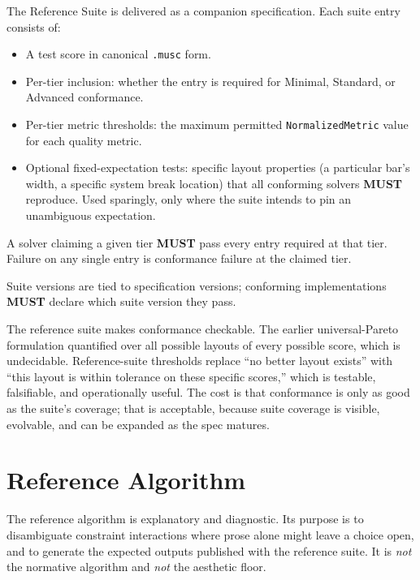 \documentclass[11pt,letterpaper]{report}
\newcounter{requirement}[chapter]
\newcommand{\MUST}{\textbf{MUST}}
\begin{document}
\begin{requirement}
  \label{req:solver:reference-suite-passage}
  The Reference Suite is delivered as a companion specification.
  Each suite entry consists of:

  \begin{itemize}
    \item A test score in canonical \texttt{.musc} form.
    \item Per-tier inclusion: whether the entry is required for
      Minimal, Standard, or Advanced conformance.
    \item Per-tier metric thresholds: the maximum permitted
      \texttt{NormalizedMetric} value for each quality metric.
    \item Optional fixed-expectation tests: specific layout
      properties (a particular bar's width, a specific system
      break location) that all conforming solvers \MUST{}
      reproduce. Used sparingly, only where the suite intends to
      pin an unambiguous expectation.
  \end{itemize}

  A solver claiming a given tier \MUST{} pass every entry
  required at that tier. Failure on any single entry is
  conformance failure at the claimed tier.

  Suite versions are tied to specification versions; conforming
  implementations \MUST{} declare which suite version they pass.
\end{requirement}

\begin{rationale}
  The reference suite makes conformance checkable. The earlier
  universal-Pareto formulation quantified over all possible
  layouts of every possible score, which is undecidable.
  Reference-suite thresholds replace ``no better layout exists''
  with ``this layout is within tolerance on these specific
  scores,'' which is testable, falsifiable, and operationally
  useful. The cost is that conformance is only as good as the
  suite's coverage; that is acceptable, because suite coverage is
  visible, evolvable, and can be expanded as the spec matures.
\end{rationale}

\section{Reference Algorithm}
\label{sec:solver:reference-algo}

The reference algorithm is explanatory and diagnostic. Its purpose
is to disambiguate constraint interactions where prose alone might
leave a choice open, and to generate the expected outputs published
with the reference suite. It is \emph{not} the normative algorithm
and \emph{not} the aesthetic floor.
\end{document}
